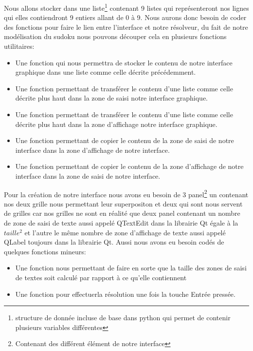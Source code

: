 Nous allons stocker dans une liste\footnote{\label{liste_Python}structure de donnée incluse de base dans python qui permet de contenir plusieurs variables différentes} contenant 9 listes qui représenteront nos lignes qui elles contiendront 9 entiers allant de 0 à 9. Nous aurons donc besoin de coder des fonctions pour faire le lien entre l'interface et notre résolveur, du fait de notre modélisation du sudoku nous pouvons découper cela en plusieurs fonctions utilitaires:\newline
\begin{itemize}
\item Une fonction qui nous permettra de stocker le contenu de notre interface graphique dans une liste comme celle décrite précédemment.
\item Une fonction permettant de transférer le contenu d'une liste comme celle décrite plus haut dans la zone de saisi notre interface graphique.
\item Une fonction permettant de transférer le contenu d'une liste comme celle décrite plus haut dans la zone d'affichage notre interface graphique.
\item Une fonction permettant de copier le contenu de la zone de saisi de notre interface dans la zone d'affichage de notre interface.
\item Une fonction permettant de copier le contenu de la zone d'affichage de notre interface dans la zone de saisi de notre interface.
\end{itemize}

Pour la création de notre interface nous avons eu besoin de 3 panel\footnote{Contenant des différent élément de notre interface} un contenant nos deux grille nous permettant leur superpositon et deux qui sont nous servent de grilles car nos grilles ne sont en réalité que deux panel contenant un nombre de zone de saisi de texte aussi appelé QTextEdit dans la librairie Qt égale à la $taille^{2}$ et l'autre le même nombre de zone d'affichage de texte aussi appelé QLabel toujours dans la librairie Qt. Aussi nous avons eu besoin codés de quelques fonctions mineurs:\newline

\begin{itemize}
\item Une fonction nous permettant de faire en sorte que la taille des zones de saisi de textes soit calculé par rapport à ce qu'elle contiennent
\item Une fonction pour effectuerla résolution une fois la touche Entrée pressée.
\end{itemize}

